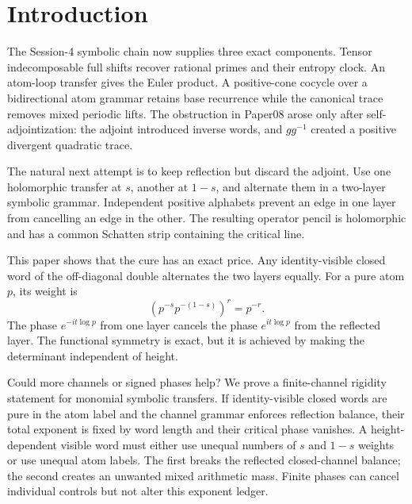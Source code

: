 \section{Introduction}
\label{sec:introduction}

The Session-4 symbolic chain now supplies three exact components.  Tensor
indecomposable full shifts recover rational primes and their entropy clock.
An atom-loop transfer gives the Euler product.  A positive-cone cocycle over a
bidirectional atom grammar retains base recurrence while the canonical trace
removes mixed periodic lifts.  The obstruction in Paper08 arose only after
self-adjointization: the adjoint introduced inverse words, and $gg^{-1}$
created a positive divergent quadratic trace.

The natural next attempt is to keep reflection but discard the adjoint.  Use
one holomorphic transfer at $s$, another at $1-s$, and alternate them in a
two-layer symbolic grammar.  Independent positive alphabets prevent an edge
in one layer from cancelling an edge in the other.  The resulting operator
pencil is holomorphic and has a common Schatten strip containing the critical
line.



This paper shows that the cure has an exact price.  Any identity-visible
closed word of the off-diagonal double alternates the two layers equally.
For a pure atom $p$, its weight is
\[
 (p^{-s}p^{-(1-s)})^r=p^{-r}.                \tag{1.1}
\]
The phase $e^{-it\log p}$ from one layer cancels the phase
$e^{it\log p}$ from the reflected layer.  The functional symmetry is exact,
but it is achieved by making the determinant independent of height.

Could more channels or signed phases help?  We prove a finite-channel
rigidity statement for monomial symbolic transfers.  If identity-visible
closed words are pure in the atom label and the channel grammar enforces
reflection balance, their total exponent is fixed by word length and their
critical phase vanishes.  A height-dependent visible word must either use
unequal numbers of $s$ and $1-s$ weights or use unequal atom labels.  The first
breaks the reflected closed-channel balance; the second creates an unwanted
mixed arithmetic mass.  Finite phases can cancel individual controls but not
alter this exponent ledger.

